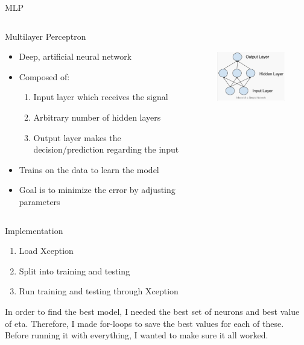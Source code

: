 \documentclass[leqno]{beamer}
\begin{document}
\begin{frame}{MLP}
    \begin{columns}
        \begin{column}{0.45\textwidth}
            Multilayer Perceptron
            \begin{itemize}
                \item Deep, artificial neural network
                \item Composed of:
                \begin{enumerate}
                    \item Input layer which receives the signal
                    \item Arbitrary number of hidden layers 
                    \item Output layer makes the decision/prediction regarding the input
                \end{enumerate}
                \item Trains on the data to learn the model
                \item Goal is to minimize the error by adjusting parameters
            \end{itemize}
        \end{column}
        \begin{column}{0.45\textwidth}
            \begin{figure}
                \includegraphics[height=4cm]{MLP.jpg}
            \end{figure}
        \end{column}
    \end{columns}
\end{frame}

\begin{frame}{Implementation}
    \begin{enumerate}
        \item Load Xception
        \item Split into training and testing
        \item Run training and testing through Xception
    \end{enumerate}
    \pause
    \vspace{0.25in}
    In order to find the best model, I needed the best set of neurons and best value of eta.  
    Therefore, I made for-loops to save the best values for each of these.  Before running 
    it with everything, I wanted to make sure it all worked.
\end{frame}
\end{document}
